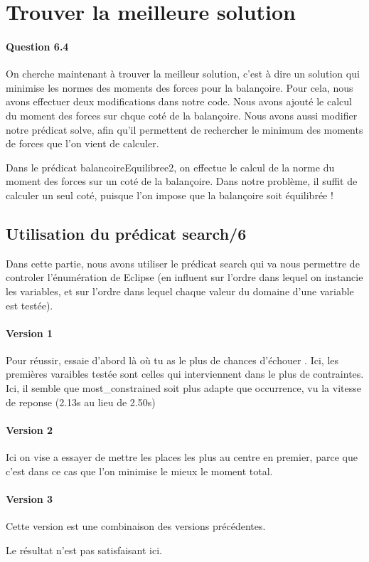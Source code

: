 \documentclass[11pt]{article} %
\begin{document}
\section{Trouver la meilleure solution}
\paragraph{Question 6.4} On cherche maintenant à trouver la meilleur solution, c'est à dire un solution qui minimise les normes des moments des forces pour la balançoire.
Pour cela, nous avons effectuer deux modifications dans notre code. Nous avons ajouté le calcul du moment des forces sur chque coté de la balançoire. Nous avons aussi modifier notre prédicat solve, afin qu'il permettent de rechercher le minimum des moments de forces que l'on vient de calculer.

Dans le prédicat balancoireEquilibree2, on effectue le calcul de la norme du moment des forces sur un coté de la balançoire. Dans notre problème, il suffit de calculer un seul coté, puisque l'on impose que la balançoire soit équilibrée !

\subsection*{Utilisation du prédicat \textbf{search/6}}
Dans cette partie, nous avons utiliser le prédicat search qui va nous permettre de controler l'énumération de Eclipse (en influent sur l'ordre dans lequel on instancie les variables, et sur l'ordre dans lequel chaque valeur du domaine d'une variable est testée).
\paragraph{Version 1} \og Pour réussir, essaie d'abord là où tu as le plus de chances d'échouer \fg. Ici, les premières varaibles testée sont celles qui interviennent dans le plus de contraintes.
 Ici, il semble que most\_constrained soit plus adapte que occurrence, vu la vitesse de reponse (2.13s au lieu de 2.50s)
\paragraph{Version 2}
Ici on vise a essayer de mettre les places les plus au centre en premier,
parce que c'est dans ce cas que l'on minimise le mieux le moment total.

\paragraph{Version 3}
Cette version est une combinaison des versions précédentes.

Le résultat n'est pas satisfaisant ici.
\end{document}
